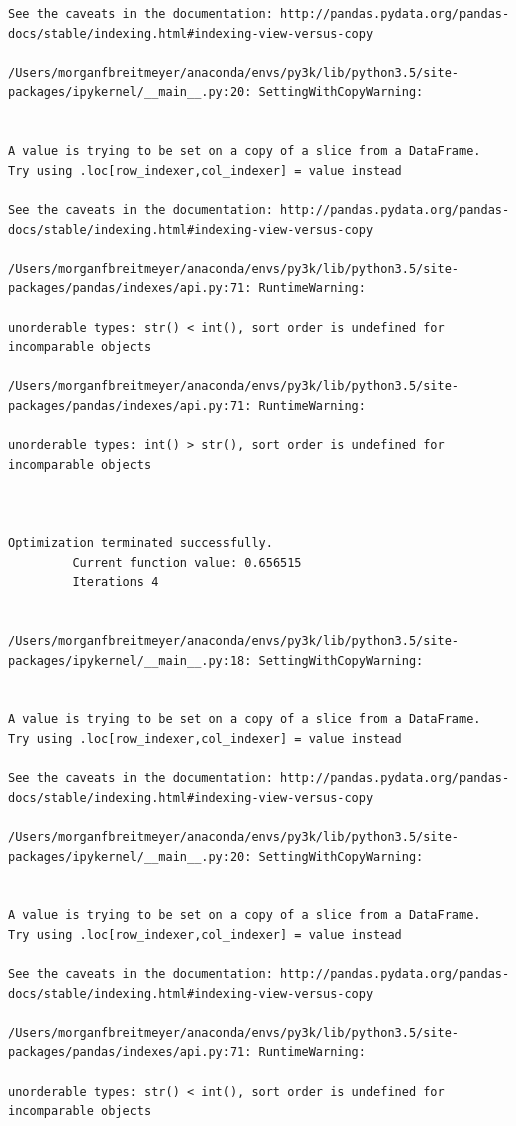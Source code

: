 \begin{lstlisting}
See the caveats in the documentation: http://pandas.pydata.org/pandas-docs/stable/indexing.html#indexing-view-versus-copy

/Users/morganfbreitmeyer/anaconda/envs/py3k/lib/python3.5/site-packages/ipykernel/__main__.py:20: SettingWithCopyWarning:


A value is trying to be set on a copy of a slice from a DataFrame.
Try using .loc[row_indexer,col_indexer] = value instead

See the caveats in the documentation: http://pandas.pydata.org/pandas-docs/stable/indexing.html#indexing-view-versus-copy

/Users/morganfbreitmeyer/anaconda/envs/py3k/lib/python3.5/site-packages/pandas/indexes/api.py:71: RuntimeWarning:

unorderable types: str() < int(), sort order is undefined for incomparable objects

/Users/morganfbreitmeyer/anaconda/envs/py3k/lib/python3.5/site-packages/pandas/indexes/api.py:71: RuntimeWarning:

unorderable types: int() > str(), sort order is undefined for incomparable objects



Optimization terminated successfully.
         Current function value: 0.656515
         Iterations 4


/Users/morganfbreitmeyer/anaconda/envs/py3k/lib/python3.5/site-packages/ipykernel/__main__.py:18: SettingWithCopyWarning:


A value is trying to be set on a copy of a slice from a DataFrame.
Try using .loc[row_indexer,col_indexer] = value instead

See the caveats in the documentation: http://pandas.pydata.org/pandas-docs/stable/indexing.html#indexing-view-versus-copy

/Users/morganfbreitmeyer/anaconda/envs/py3k/lib/python3.5/site-packages/ipykernel/__main__.py:20: SettingWithCopyWarning:


A value is trying to be set on a copy of a slice from a DataFrame.
Try using .loc[row_indexer,col_indexer] = value instead

See the caveats in the documentation: http://pandas.pydata.org/pandas-docs/stable/indexing.html#indexing-view-versus-copy

/Users/morganfbreitmeyer/anaconda/envs/py3k/lib/python3.5/site-packages/pandas/indexes/api.py:71: RuntimeWarning:

unorderable types: str() < int(), sort order is undefined for incomparable objects


\end{lstlisting}
